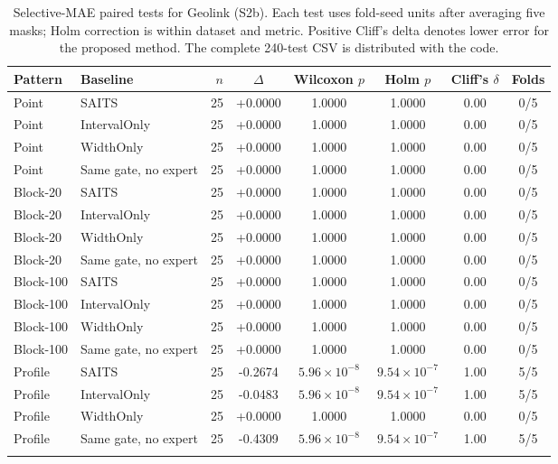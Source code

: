 \begin{table}
\caption{Selective-MAE paired tests for Geolink (S2b).
Each test uses fold-seed units after averaging five masks; Holm correction is
within dataset and metric. Positive Cliff's delta denotes lower error for the
proposed method. The complete 240-test CSV is distributed with the code.}
\label{tab:s2b}
\centering
\scriptsize
\setlength{\tabcolsep}{3.6pt}
\begin{tabular*}{\textwidth}{@{\extracolsep{\fill}}llrccccc@{}}
\toprule
Pattern & Baseline & $n$ & $\Delta$ & Wilcoxon $p$ & Holm $p$ & Cliff's $\delta$ & Folds \\
\midrule
Point & SAITS & 25 & +0.0000 & 1.0000 & 1.0000 & 0.00 & 0/5 \\
Point & IntervalOnly & 25 & +0.0000 & 1.0000 & 1.0000 & 0.00 & 0/5 \\
Point & WidthOnly & 25 & +0.0000 & 1.0000 & 1.0000 & 0.00 & 0/5 \\
Point & Same gate, no expert & 25 & +0.0000 & 1.0000 & 1.0000 & 0.00 & 0/5 \\
\addlinespace[1.5pt]
Block-20 & SAITS & 25 & +0.0000 & 1.0000 & 1.0000 & 0.00 & 0/5 \\
Block-20 & IntervalOnly & 25 & +0.0000 & 1.0000 & 1.0000 & 0.00 & 0/5 \\
Block-20 & WidthOnly & 25 & +0.0000 & 1.0000 & 1.0000 & 0.00 & 0/5 \\
Block-20 & Same gate, no expert & 25 & +0.0000 & 1.0000 & 1.0000 & 0.00 & 0/5 \\
\addlinespace[1.5pt]
Block-100 & SAITS & 25 & +0.0000 & 1.0000 & 1.0000 & 0.00 & 0/5 \\
Block-100 & IntervalOnly & 25 & +0.0000 & 1.0000 & 1.0000 & 0.00 & 0/5 \\
Block-100 & WidthOnly & 25 & +0.0000 & 1.0000 & 1.0000 & 0.00 & 0/5 \\
Block-100 & Same gate, no expert & 25 & +0.0000 & 1.0000 & 1.0000 & 0.00 & 0/5 \\
\addlinespace[1.5pt]
Profile & SAITS & 25 & -0.2674 & $5.96\times10^{-8}$ & $9.54\times10^{-7}$ & 1.00 & 5/5 \\
Profile & IntervalOnly & 25 & -0.0483 & $5.96\times10^{-8}$ & $9.54\times10^{-7}$ & 1.00 & 5/5 \\
Profile & WidthOnly & 25 & +0.0000 & 1.0000 & 1.0000 & 0.00 & 0/5 \\
Profile & Same gate, no expert & 25 & -0.4309 & $5.96\times10^{-8}$ & $9.54\times10^{-7}$ & 1.00 & 5/5 \\
\addlinespace[1.5pt]
\bottomrule
\end{tabular*}
\end{table}
\clearpage

